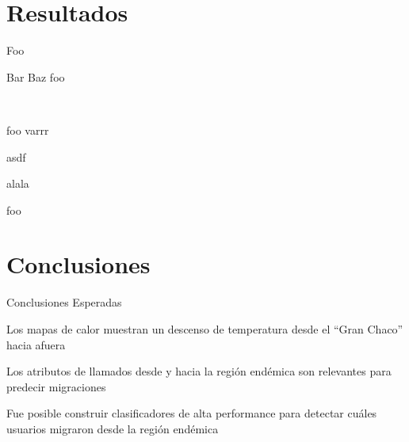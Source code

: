\documentclass{beamer}
\begin{document}
\section{Resultados}

%
%
%
%

\begin{frame}{Foo}
	\begin{block}{Bar}
		Baz
		\medskip
		foo
	\end{block}

	\pause\

	\begin{block}{foo}
		varrr

		\medskip
			asdf

		\medskip
		alala

		\medskip
		foo
	\end{block}
\end{frame}


\section{Conclusiones}



\begin{frame}{Conclusiones Esperadas}

	Los mapas de calor muestran un descenso de temperatura desde el ``Gran Chaco'' hacia afuera

	\medskip
	Los atributos de llamados desde y hacia la región endémica son relevantes para predecir migraciones

	\medskip
	Fue posible construir clasificadores de alta performance para detectar cuáles usuarios migraron desde la región endémica

\end{frame}
\end{document}
